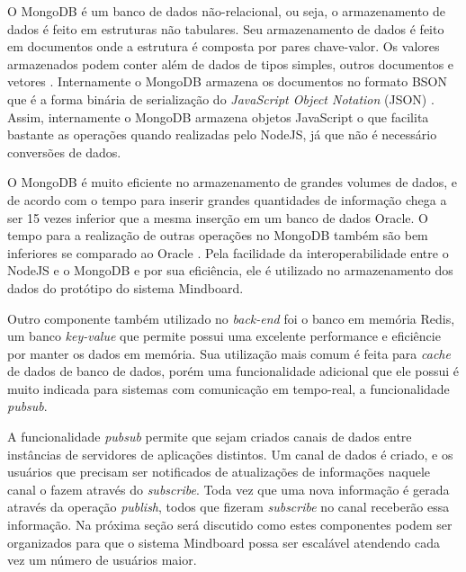 O MongoDB é um banco de dados não-relacional, ou seja, o armazenamento de dados é feito em estruturas não tabulares. Seu armazenamento de dados é feito em documentos onde a estrutura é composta por pares chave-valor. Os valores armazenados podem conter além de dados de tipos simples, outros documentos e vetores \cite{mongodb_documentos}. Internamente o MongoDB armazena os documentos no formato BSON que é a forma binária de serialização do \emph{JavaScript Object Notation} (JSON) \cite{bson}. Assim, internamente o MongoDB armazena objetos JavaScript o que facilita bastante as operações quando realizadas pelo NodeJS, já que não é necessário conversões de dados.

O MongoDB é muito eficiente no armazenamento de grandes volumes de dados, e de acordo com  o tempo para inserir grandes quantidades de informação chega a ser 15 vezes inferior que a mesma inserção em um banco de dados Oracle. O tempo para a realização de outras operações no MongoDB também são bem inferiores se comparado ao Oracle \cite{mongodb_oracle}. Pela facilidade da interoperabilidade entre o NodeJS e o MongoDB e por sua eficiência, ele é utilizado no armazenamento dos dados do protótipo do sistema Mindboard.

Outro componente também utilizado no \emph{back-end} foi o banco em memória Redis, um banco \emph{key-value} que permite possui uma excelente performance e eficiêncie por manter os dados em memória. Sua utilização mais comum é feita para \emph{cache} de dados de banco de dados, porém uma funcionalidade adicional que ele possui é muito indicada para sistemas com comunicação em tempo-real, a funcionalidade \emph{pubsub}.

A funcionalidade \emph{pubsub} \cite{redis_pubsub} permite que sejam criados canais de dados entre instâncias de servidores de aplicações distintos. Um canal de dados é criado, e os usuários que precisam ser notificados de atualizações de informações naquele canal o fazem através do \emph{subscribe}. Toda vez que uma nova informação é gerada através da operação \emph{publish}, todos que fizeram \emph{subscribe} no canal receberão essa informação. Na próxima seção será discutido como estes componentes podem ser organizados para que o sistema Mindboard possa ser escalável atendendo cada vez um número de usuários maior.


